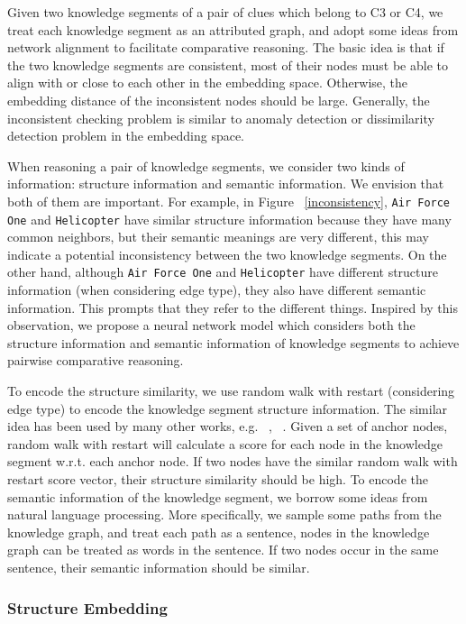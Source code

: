 Given two knowledge segments of a pair of clues which belong to C3 or C4,
we treat each knowledge segment as an attributed graph, and adopt some ideas from network alignment to facilitate comparative reasoning.
The basic idea is that if the two knowledge segments are consistent, most of their nodes must be able to align with or close to each other in the embedding space. Otherwise, the embedding distance of the inconsistent nodes should be large.
Generally, the inconsistent checking problem is similar to anomaly detection or dissimilarity detection problem in the embedding space.

When reasoning a pair of knowledge segments, we consider two kinds of information: structure information and semantic information. We envision that both of them are important. For example, in Figure ~\ref{inconsistency}, {\tt Air Force One} and {\tt Helicopter} have similar structure information because they have many common neighbors, but their semantic meanings are very different, this may indicate a potential inconsistency between the two knowledge segments. On the other hand, although {\tt Air Force One} and {\tt Helicopter} have different structure information (when considering edge type), they also have different semantic information. This prompts that they refer to the different things. Inspired by this observation, we propose a neural network model which considers both the structure information and semantic information of knowledge segments to achieve pairwise comparative reasoning.



To encode the structure similarity, we use random walk with restart (considering edge type) to encode the knowledge segment structure information. The similar idea has been used by many other works, e.g. ~\cite{Tong2006rdwalk}, ~\cite{bright}.
Given a set of anchor nodes, random walk with restart will calculate a score for each node in the knowledge segment w.r.t. each anchor node. If two nodes have the similar random walk with restart score vector, their structure similarity should be high.
To encode the semantic information of the knowledge segment, we borrow some ideas from natural language processing. More specifically, we sample some paths from the knowledge graph, and treat each path as a sentence, nodes in the knowledge graph can be treated as words in the sentence. If two nodes occur in the same sentence, their semantic information should be similar.


\subsubsection{Structure Embedding}

